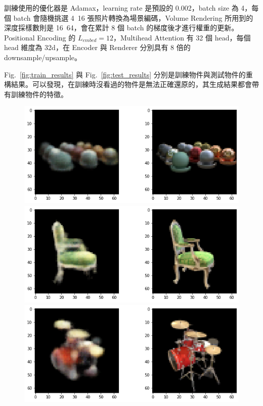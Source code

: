 \documentclass[10pt,twocolumn,letterpaper]{article}
\begin{document}
\begin{CJK}{UTF8}{bkai}
   訓練使用的優化器是 Adamax，learning rate 是預設的 0.002，batch size 為 4，每個 batch 會隨機挑選 4~16
   張照片轉換為場景編碼，Volume Rendering 所用到的深度採樣數則是 16~64，會在累計 8 個 batch 的梯度後才進行權重的更新。Positional Encoding 的
   $L_{embed}=12$，Multihead Attention 有 32 個 head，每個 head 維度為 32d，在 Encoder 與 Renderer 分別具有 8 倍的 downsample/upsample。


   Fig.~\ref{fig:train_results} 與 Fig.~\ref{fig:test_results}
   分別是訓練物件與測試物件的重構結果。可以發現，在訓練時沒看過的物件是無法正確還原的，其生成結果都會帶有訓練物件的特徵。
   \begin{figure}
      \begin{center}
         \includegraphics[width=1\linewidth]{img/experiment/train_0.png}
         \includegraphics[width=1\linewidth]{img/experiment/train_1.png}
         \includegraphics[width=1\linewidth]{img/experiment/train_2.png}

\end{center}
\end{figure}
\end{CJK}
\end{document}
